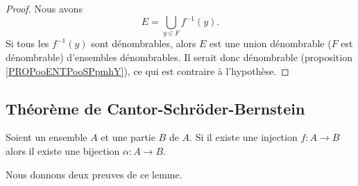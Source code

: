 \begin{proof}
    Nous avons
    \begin{equation}
        E=\bigcup_{y\in F}f^{-1}(y).
    \end{equation}
    Si tous les \( f^{-1}(y)\) sont dénombrables, alors \( E\) est une union dénombrable (\( F\) est dénombrable) d'ensembles dénombrables. Il serait donc dénombrable (proposition \ref{PROPooENTPooSPpmhY}), ce qui est contraire à l'hypothèse.
\end{proof}

\subsection{Théorème de Cantor-Schröder-Bernstein}

\begin{lemma}     \label{LEMooTNMHooBpdzab}
    Soient un ensemble \( A\) et une partie \( B\) de \( A\). Si il existe une injection \( f\colon A\to B\) alors il existe une bijection \( \alpha\colon A\to B\).
\end{lemma}

Nous donnons deux preuves de ce lemme.

